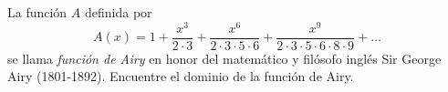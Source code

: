 \item La función $A$ definida por
    \[ A(x) = 1 + \frac{x^3}{2 \cdot 3} + \frac{x^6}{2 \cdot 3 \cdot 5 \cdot 6} + \frac{x^9}{2 \cdot 3 \cdot 5 \cdot 6 \cdot 8 \cdot 9} + \dots \]
    se llama \textit{función de Airy} en honor del matemático y filósofo inglés Sir George Airy (1801-1892). Encuentre el dominio de la función de Airy.
